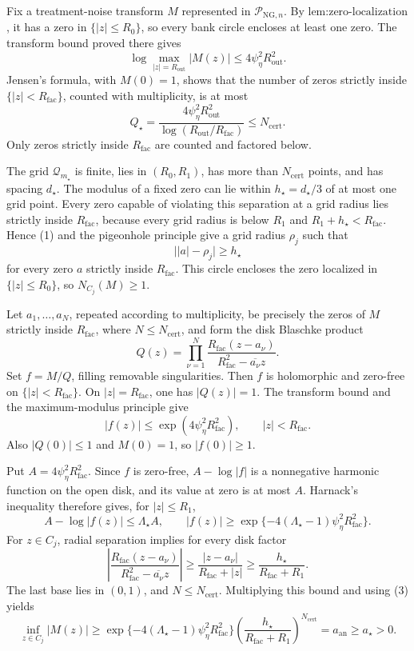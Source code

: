 Fix a treatment-noise transform \(M\) represented in \(\mathcal P_{\mathrm{NG},n}\).  By \(\text{lem:zero-localization}\), it has a zero in \(\{|z|\le R_0\}\), so every bank circle encloses at least one zero.  The transform bound proved there gives
\[
 \log\max_{|z|=R_{\mathrm{out}}}|M(z)|
 \le4\psi_{\eta}^2R_{\mathrm{out}}^2.
\]
Jensen's formula, with \(M(0)=1\), shows that the number of zeros strictly inside \(\{|z|<R_{\mathrm{fac}}\}\), counted with multiplicity, is at most
\[
 Q_{\star}
 =\frac{4\psi_{\eta}^2R_{\mathrm{out}}^2}
        {\log(R_{\mathrm{out}}/R_{\mathrm{fac}})}
 \le N_{\mathrm{cert}}. \tag{1}
\]
Only zeros strictly inside \(R_{\mathrm{fac}}\) are counted and factored below.

The grid \(\mathcal Q_{m_{\star}}\) is finite, lies in \((R_0,R_1)\), has more than \(N_{\mathrm{cert}}\) points, and has spacing \(d_{\star}\).  The modulus of a fixed zero can lie within \(h_{\star}=d_{\star}/3\) of at most one grid point.  Every zero capable of violating this separation at a grid radius lies strictly inside \(R_{\mathrm{fac}}\), because every grid radius is below \(R_1\) and \(R_1+h_{\star}<R_{\mathrm{fac}}\).  Hence (1) and the pigeonhole principle give a grid radius \(\rho_j\) such that
\[
 \bigl||a|-\rho_j\bigr|\ge h_{\star}
\]
for every zero \(a\) strictly inside \(R_{\mathrm{fac}}\).  This circle encloses the zero localized in \(\{|z|\le R_0\}\), so \(N_{C_j}(M)\ge1\).

Let \(a_1,\ldots,a_N\), repeated according to multiplicity, be precisely the zeros of \(M\) strictly inside \(R_{\mathrm{fac}}\), where \(N\le N_{\mathrm{cert}}\), and form the disk Blaschke product
\[
 Q(z)=\prod_{\nu=1}^N
 \frac{R_{\mathrm{fac}}(z-a_\nu)}
      {R_{\mathrm{fac}}^2-\overline{a_\nu}z}.
\]
Set \(f=M/Q\), filling removable singularities.  Then \(f\) is holomorphic and zero-free on \(\{|z|<R_{\mathrm{fac}}\}\).  On \(|z|=R_{\mathrm{fac}}\), one has \(|Q(z)|=1\).  The transform bound and the maximum-modulus principle give
\[
 |f(z)|\le \exp(4\psi_{\eta}^2R_{\mathrm{fac}}^2),
 \qquad |z|<R_{\mathrm{fac}}. \tag{2}
\]
Also \(|Q(0)|\le1\) and \(M(0)=1\), so \(|f(0)|\ge1\).

Put \(A=4\psi_{\eta}^2R_{\mathrm{fac}}^2\).  Since \(f\) is zero-free, \(A-\log|f|\) is a nonnegative harmonic function on the open disk, and its value at zero is at most \(A\).  Harnack's inequality therefore gives, for \(|z|\le R_1\),
\[
 A-\log|f(z)|\le\Lambda_{\star}A,
 \qquad
 |f(z)|\ge
 \exp\{-4(\Lambda_{\star}-1)\psi_{\eta}^2R_{\mathrm{fac}}^2\}. \tag{3}
\]
For \(z\in C_j\), radial separation implies for every disk factor
\[
 \left|
 \frac{R_{\mathrm{fac}}(z-a_\nu)}
      {R_{\mathrm{fac}}^2-\overline{a_\nu}z}
 \right|
 \ge \frac{|z-a_\nu|}{R_{\mathrm{fac}}+|z|}
 \ge \frac{h_{\star}}{R_{\mathrm{fac}}+R_1}.
\]
The last base lies in \((0,1)\), and \(N\le N_{\mathrm{cert}}\).  Multiplying this bound and using (3) yields
\[
 \inf_{z\in C_j}|M(z)|
 \ge
 \exp\{-4(\Lambda_{\star}-1)\psi_{\eta}^2R_{\mathrm{fac}}^2\}
 \left(\frac{h_{\star}}{R_{\mathrm{fac}}+R_1}\right)^{N_{\mathrm{cert}}}
 =a_{\mathrm{an}}
 \ge a_{\star}>0. \tag{4}
\]

